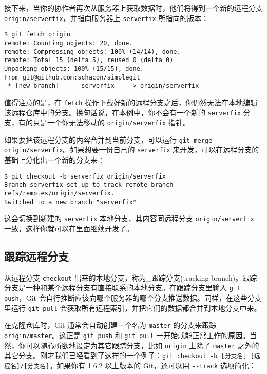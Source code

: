 \documentclass[a4paper]{book}
\begin{document}
接下来，当你的协作者再次从服务器上获取数据时，他们将得到一个新的远程分支 \texttt{origin/serverfix}，并指向服务器上 \texttt{serverfix} 所指向的版本：

\begin{shaded}\begin{verbatim}
$ git fetch origin
remote: Counting objects: 20, done.
remote: Compressing objects: 100% (14/14), done.
remote: Total 15 (delta 5), reused 0 (delta 0)
Unpacking objects: 100% (15/15), done.
From git@github.com:schacon/simplegit
 * [new branch]      serverfix    -> origin/serverfix
\end{verbatim}\end{shaded}

值得注意的是，在 \texttt{fetch} 操作下载好新的远程分支之后，你仍然无法在本地编辑该远程仓库中的分支。换句话说，在本例中，你不会有一个新的 \texttt{serverfix} 分支，有的只是一个你无法移动的 \texttt{origin/serverfix} 指针。

如果要把该远程分支的内容合并到当前分支，可以运行 \texttt{git merge origin/serverfix}。如果想要一份自己的 \texttt{serverfix} 来开发，可以在远程分支的基础上分化出一个新的分支来：

\begin{shaded}\begin{verbatim}
$ git checkout -b serverfix origin/serverfix
Branch serverfix set up to track remote branch refs/remotes/origin/serverfix.
Switched to a new branch "serverfix"
\end{verbatim}\end{shaded}

这会切换到新建的 \texttt{serverfix} 本地分支，其内容同远程分支 \texttt{origin/serverfix} 一致，这样你就可以在里面继续开发了。

\subsection{跟踪远程分支}

从远程分支 \texttt{checkout} 出来的本地分支，称为\_跟踪分支(tracking branch)。跟踪分支是一种和某个远程分支有直接联系的本地分支。在跟踪分支里输入 \texttt{git push}，Git 会自行推断应该向哪个服务器的哪个分支推送数据。同样，在这些分支里运行 \texttt{git pull} 会获取所有远程索引，并把它们的数据都合并到本地分支中来。

在克隆仓库时，Git 通常会自动创建一个名为 \texttt{master} 的分支来跟踪 \texttt{origin/master}。这正是 \texttt{git push} 和 \texttt{git pull} 一开始就能正常工作的原因。当然，你可以随心所欲地设定为其它跟踪分支，比如 \texttt{origin} 上除了 \texttt{master} 之外的其它分支。刚才我们已经看到了这样的一个例子：\texttt{git checkout -b {[}分支名{]} {[}远程名{]}/{[}分支名{]}}。如果你有 1.6.2 以上版本的 Git，还可以用 \texttt{-{}-track} 选项简化：
\end{document}
